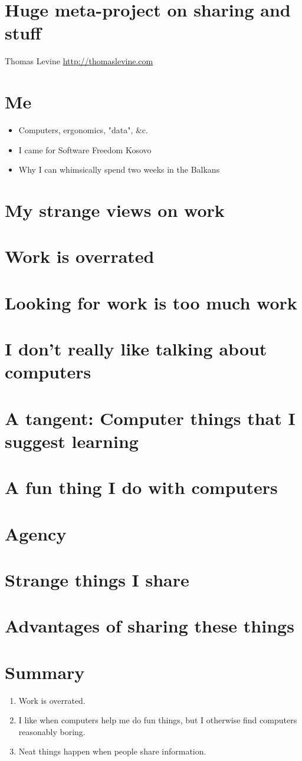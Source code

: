 \documentclass[12pt]{article}
\newcommand\newslide[1] {
  \newpage
  \section*{#1}
}
\begin{document}
\newslide{Huge meta-project on sharing and stuff}
\noindent Thomas Levine
\noindent \url{http://thomaslevine.com}

\newslide{Me}
\begin{itemize}
\item Computers, ergonomics, "data", &c.
\item I came for Software Freedom Kosovo
\item Why I can whimsically spend two weeks in the Balkans
\end{itemize}


\newslide{My strange views on work}

\newslide{Work is overrated}
\newslide{Looking for work is too much work}
\newslide{I don't really like talking about computers}

\newslide{A tangent: Computer things that I suggest learning}

\newslide{A fun thing I do with computers}

\newslide{Agency}

\newslide{Strange things I share}

\newslide{Advantages of sharing these things}

\newslide{Summary}
\begin{enumerate}
\item Work is overrated.
\item I like when computers help me do fun things, but I otherwise find computers reasonably boring.
\item Neat things happen when people share information.
\end{enumerate}
\end{document}
